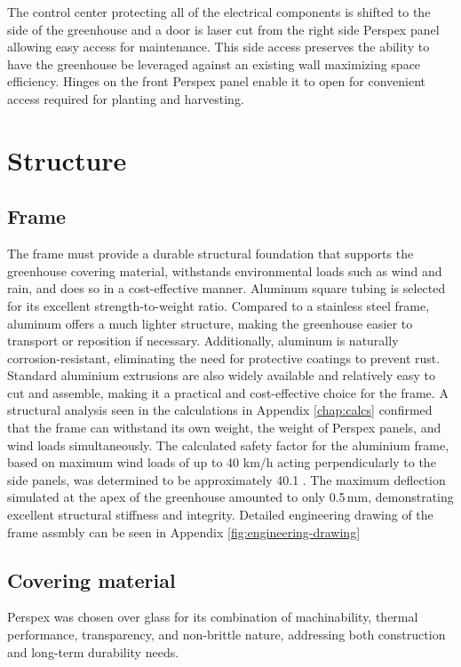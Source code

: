 The control center protecting all of the electrical components is shifted to the side of the greenhouse and a door is laser cut from the right side Perspex panel allowing easy access for maintenance. This side access preserves the ability to have the greenhouse be leveraged against an existing wall maximizing space efficiency. Hinges on the front Perspex panel enable it to open for convenient access required for planting and harvesting.


\section{Structure}
\subsection{Frame}
The frame must provide a durable structural foundation that supports the greenhouse covering material, withstands environmental loads such as wind and rain, and does so in a cost-effective manner. Aluminum square tubing is selected for its excellent strength-to-weight ratio. Compared to a stainless steel frame, aluminum offers a much lighter structure, making the greenhouse easier to transport or reposition if necessary. Additionally, aluminum is naturally corrosion-resistant, eliminating the need for protective coatings to prevent rust. Standard aluminium extrusions are also widely available and relatively easy to cut and assemble, making it a practical and cost-effective choice for the frame. A structural analysis seen in the calculations in Appendix \ref{chap:calcs} confirmed that the frame can withstand its own weight, the weight of Perspex panels, and wind loads simultaneously. The calculated safety factor for the aluminium frame, based on maximum wind loads of up to 40 km/h acting perpendicularly to the side panels, was determined to be approximately 40.1 . The maximum deflection simulated at the apex of the greenhouse amounted to only 0.5\,mm, demonstrating excellent structural stiffness and integrity. Detailed engineering drawing of the frame assmbly can be seen in Appendix \ref{fig:engineering-drawing}

\subsection{Covering material}
Perspex was chosen over glass for its combination of machinability, thermal performance, transparency, and non-brittle nature, addressing both construction and long-term durability needs.

